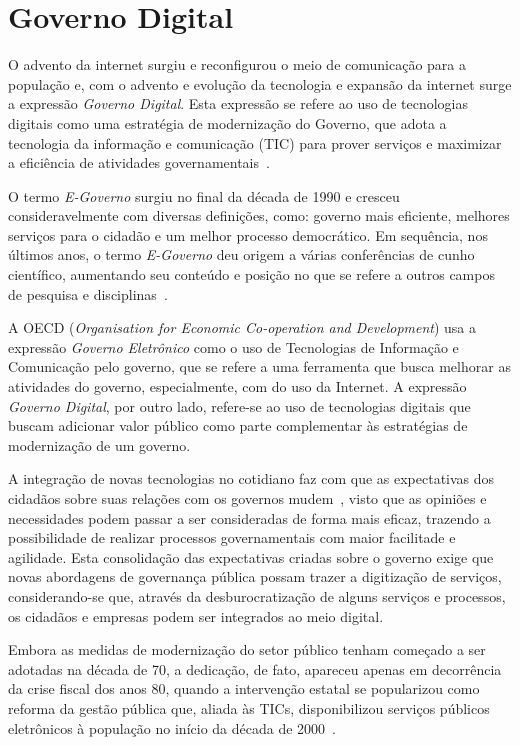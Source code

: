 \section{Governo Digital}

O advento da internet surgiu e reconfigurou o meio de comunicação para a população e, com o advento e evolução da tecnologia 
e expansão da internet surge a expressão \textit{Governo Digital}. Esta expressão se refere ao uso de tecnologias digitais como uma 
estratégia de modernização do Governo, que adota a tecnologia da informação e comunicação (TIC) para prover 
serviços e maximizar a eficiência de atividades governamentais~\cite{fang2002government}. 

O termo \textit{E-Governo} surgiu no final da década de 1990 e cresceu consideravelmente com 
diversas definições, como: governo mais eficiente, melhores serviços para o cidadão e um melhor processo 
democrático. Em sequência, nos últimos anos, o termo \textit{E-Governo} deu origem a várias conferências de cunho científico, aumentando seu 
conteúdo e posição no que se refere a outros campos de pesquisa e disciplinas~\cite{gronlund2005introducing}.

A OECD (\textit{Organisation for Economic Co-operation and Development}) usa a expressão \textit {Governo Eletrônico} como o uso de 
Tecnologias de Informação e Comunicação pelo governo, que se refere a uma ferramenta que busca melhorar as atividades do governo, 
especialmente, com do uso da Internet. A expressão \textit{Governo Digital}, por outro lado, refere-se ao uso de tecnologias 
digitais que buscam adicionar valor público como parte complementar às estratégias de modernização de um governo.

A integração de novas tecnologias no cotidiano faz com que as expectativas dos cidadãos sobre suas relações com os governos mudem~\cite{oecd}, visto que as opiniões e necessidades podem passar a ser consideradas de forma mais eficaz, trazendo a possibilidade 
de realizar processos governamentais com maior facilitade e agilidade. Esta consolidação das expectativas criadas sobre o governo exige que novas abordagens de governança pública possam trazer a digitização de serviços,
considerando-se que, através da desburocratização de alguns serviços e processos, os cidadãos e empresas podem ser integrados ao meio digital.

Embora as medidas de modernização do setor público tenham começado a ser adotadas na década de 70, a dedicação, de fato, apareceu apenas em decorrência da crise fiscal dos anos 80, quando a intervenção estatal se popularizou como reforma da gestão pública que, aliada às TICs, disponibilizou serviços públicos eletrônicos à população no início da década de 2000~\cite{przeybilovicz2015desenvolvimento}.

